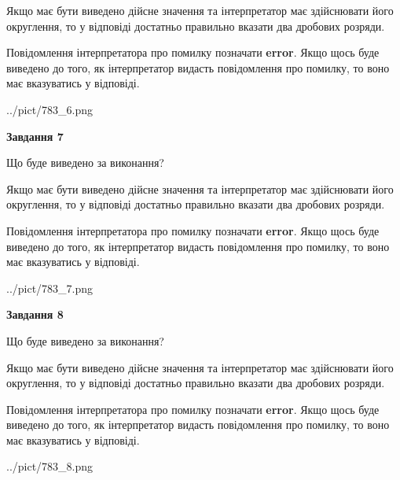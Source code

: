 \documentclass[12pt, ukrainian]{article}
\begin{document}
{\begin {Large}
Якщо має бути виведено дійсне значення та інтерпретатор має здійснювати його округлення, 
то у відповіді достатньо правильно вказати два дробових розряди.

Повідомлення інтерпретатора про помилку позначати \textbf{error}.
Якщо щось буде виведено до того, як інтерпретатор видасть повідомлення про помилку, 
то воно має вказуватись у відповіді. \par

\begin{center}
	{../pict/783_6.png}
\end{center}
\newpage

{\begin {center}\textbf{Завдання 7}\end {center}}\par
Що буде виведено за виконання? \par

Якщо має бути виведено дійсне значення та інтерпретатор має здійснювати його округлення, 
то у відповіді достатньо правильно вказати два дробових розряди.

Повідомлення інтерпретатора про помилку позначати \textbf{error}.
Якщо щось буде виведено до того, як інтерпретатор видасть повідомлення про помилку, 
то воно має вказуватись у відповіді. \par

\begin{center}
	{../pict/783_7.png}
\end{center}
\newpage

{\begin {center}\textbf{Завдання 8}\end {center}}\par
Що буде виведено за виконання? \par

Якщо має бути виведено дійсне значення та інтерпретатор має здійснювати його округлення, 
то у відповіді достатньо правильно вказати два дробових розряди.

Повідомлення інтерпретатора про помилку позначати \textbf{error}.
Якщо щось буде виведено до того, як інтерпретатор видасть повідомлення про помилку, 
то воно має вказуватись у відповіді. \par

\begin{center}
	{../pict/783_8.png}
\end{center}
\newpage


\end{Large}}
\end{document}
